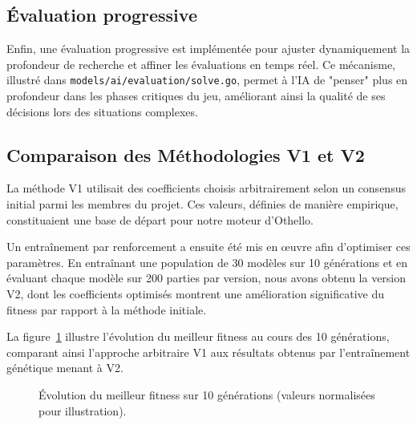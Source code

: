 \documentclass[a4paper,12pt]{article}
\begin{document}
\subsection{Évaluation progressive}
Enfin, une évaluation progressive est implémentée pour ajuster dynamiquement la profondeur de recherche et affiner les évaluations en temps réel. Ce mécanisme, illustré dans \texttt{models/ai/evaluation/solve.go}, permet à l'IA de "penser" plus en profondeur dans les phases critiques du jeu, améliorant ainsi la qualité de ses décisions lors des situations complexes.

\subsection{Comparaison des Méthodologies V1 et V2}
La méthode V1 utilisait des coefficients choisis arbitrairement selon un consensus initial parmi les membres du projet. Ces valeurs, définies de manière empirique, constituaient une base de départ pour notre moteur d'Othello.

Un entraînement par renforcement a ensuite été mis en œuvre afin d'optimiser ces paramètres. En entraînant une population de 30 modèles sur 10 générations et en évaluant chaque modèle sur 200 parties par version, nous avons obtenu la version V2, dont les coefficients optimisés montrent une amélioration significative du fitness par rapport à la méthode initiale.

La figure~\ref{fig:fitness_evolution} illustre l'évolution du meilleur fitness au cours des 10 générations, comparant ainsi l'approche arbitraire V1 aux résultats obtenus par l'entraînement génétique menant à V2.

\begin{figure}[H]
\centering
{}
\caption{Évolution du meilleur fitness sur 10 générations (valeurs normalisées pour illustration).}
\label{fig:fitness_evolution}
\end{figure}
\end{document}
